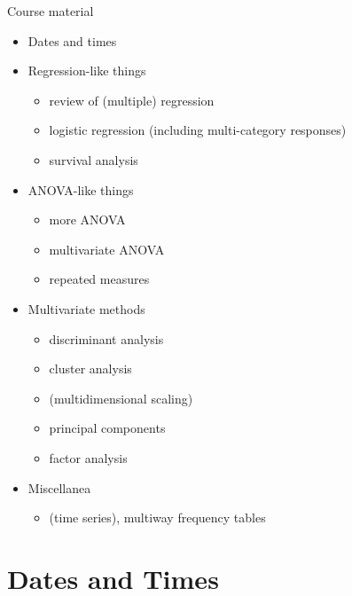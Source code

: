 \documentclass[ignorenonframetext,]{beamer}
\providecommand{\tightlist}{%
  \setlength{\itemsep}{0pt}\setlength{\parskip}{0pt}}
\begin{document}
\begin{frame}{Course material}
\protect\hypertarget{course-material}{}

\begin{itemize}
\tightlist
\item
  Dates and times
\item
  Regression-like things

  \begin{itemize}
  \tightlist
  \item
    review of (multiple) regression
  \item
    logistic regression (including multi-category responses)
  \item
    survival analysis
  \end{itemize}
\item
  ANOVA-like things

  \begin{itemize}
  \tightlist
  \item
    more ANOVA
  \item
    multivariate ANOVA
  \item
    repeated measures
  \end{itemize}
\item
  Multivariate methods

  \begin{itemize}
  \tightlist
  \item
    discriminant analysis
  \item
    cluster analysis
  \item
    (multidimensional scaling)
  \item
    principal components
  \item
    factor analysis
  \end{itemize}
\item
  Miscellanea

  \begin{itemize}
  \tightlist
  \item
    (time series), multiway frequency tables
  \end{itemize}
\end{itemize}

\end{frame}

\hypertarget{dates-and-times}{%
\section{Dates and Times}\label{dates-and-times}}
\end{document}
